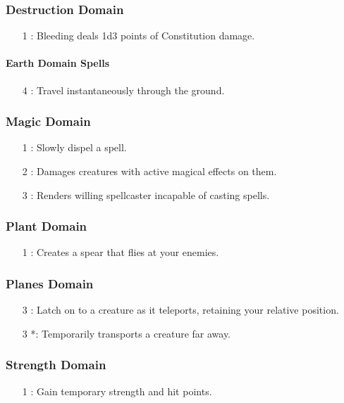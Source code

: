 \subsubsection{Destruction Domain}
\begin{itemize}
 \item[1] : Bleeding deals 1d3 points of Constitution damage.
\end{itemize}
\paragraph{Earth Domain Spells}
\begin{itemize}
 \item[4] : Travel instantaneously through the ground.
\end{itemize}
\subsubsection{Magic Domain}
\begin{itemize}
 \item[1] : Slowly dispel a spell.
 \item[2] : Damages creatures with active magical effects on them.
 \item[3] : Renders willing spellcaster incapable of casting spells.
\end{itemize}
\subsubsection{Plant Domain}
\begin{itemize}
 \item[1] : Creates a spear that flies at your enemies.
\end{itemize}
\subsubsection{Planes Domain}
\begin{itemize}
 \item[3] : Latch on to a creature as it teleports, retaining your relative position.
 \item[3] *: Temporarily transports a creature far away.
\end{itemize}
\subsubsection{Strength Domain}
\begin{itemize}
 \item[1] : Gain temporary strength and hit points.
\end{itemize}
